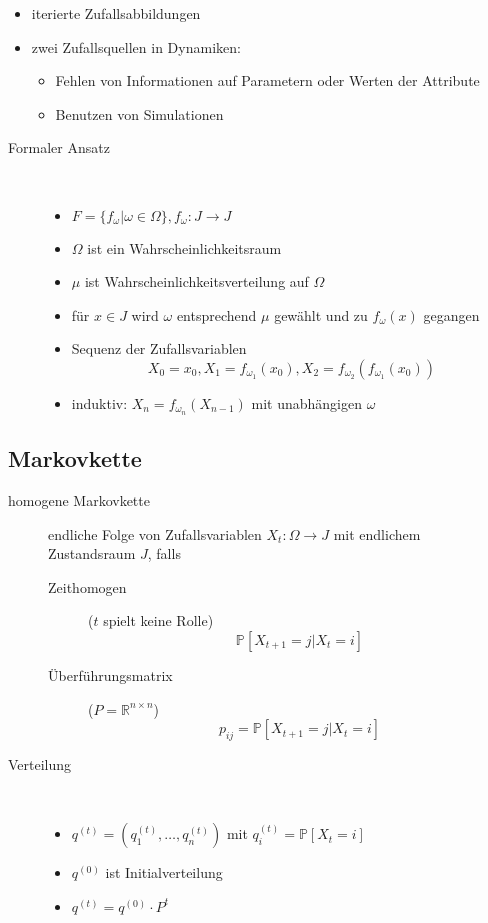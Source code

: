 \begin{itemize}
	\item iterierte Zufallsabbildungen
	\item zwei Zufallsquellen in Dynamiken:
		\begin{itemize}
			\item Fehlen von Informationen auf Parametern oder Werten der Attribute
			\item Benutzen von Simulationen
		\end{itemize}
\end{itemize}
\begin{description}
	\item[Formaler Ansatz] \ \\\vspace*{-\baselineskip}
		\begin{itemize}
			\item $F=\{f_\omega|\omega\in\Omega\}, f_\omega:J\rightarrow J$
			\item $\Omega$ ist ein Wahrscheinlichkeitsraum
			\item $\mu$ ist Wahrscheinlichkeitsverteilung auf $\Omega$
			\item für $x\in J $ wird $\omega$ entsprechend $\mu$ gewählt und zu $f_\omega(x)$ gegangen
			\item Sequenz der Zufallsvariablen
				\[X_0=x_0, X_1=f_{\omega_1}(x_0), X_2=f_{\omega_2}(f_{\omega_1}(x_0))\]
			\item induktiv: $X_n=f_{\omega_n}(X_{n-1})$ mit unabhängigen $\omega$
		\end{itemize}
\end{description}
\subsection{Markovkette}
	\begin{description}
		\item[homogene Markovkette] endliche Folge von Zufallsvariablen $X_t:\Omega\rightarrow J$ mit endlichem Zustandsraum $J$, falls
			\begin{description}
				\item[Zeithomogen] ($t$ spielt keine Rolle)
					\[\mathbb{P}[X_{t+1}=j|X_t=i]\]
				\item[Überführungsmatrix] ($P=\mathbb{R}^{n\times n}$)
					\[p_{ij}=\mathbb{P}[X_{t+1}=j|X_t=i]\]
			\end{description}
		\item[Verteilung] \ \\\vspace*{-\baselineskip}
			\begin{itemize}
				\item $q^{(t)}=(q_1^{(t)},\dots,q_n^{(t)})$ mit $q_i^{(t)}=\mathbb{P}[X_t=i]$
				\item $q^{(0)}$ ist Initialverteilung
				\item $q^{(t)}=q^{(0)}\cdot P^t$
			\end{itemize}
	\end{description}
